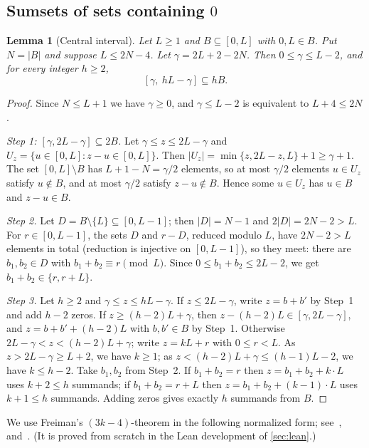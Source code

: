 \documentclass[11pt,reqno]{amsart}
\numberwithin{equation}{section}
\newtheorem{lemma}[theorem]{Lemma}
\theoremstyle{definition}
\theoremstyle{remark}
\newcommand{\card}[1]{\lvert #1\rvert}
\begin{document}
\subsection{Sumsets of sets containing \texorpdfstring{$0$}{0}}

\begin{lemma}[Central interval]\label{lem:central}
Let $L\ge1$ and $B\subseteq[0,L]$ with $0,L\in B$. Put $N=\card B$ and suppose $L\le2N-4$. Let $\gamma=2L+2-2N$. Then $0\le\gamma\le L-2$, and for every integer $h\ge2$,
\[
 [\gamma,\ hL-\gamma]\subseteq hB .
\]
\end{lemma}

\begin{proof}
Since $N\le L+1$ we have $\gamma\ge0$, and $\gamma\le L-2$ is equivalent to $L+4\le2N$.

\emph{Step 1: $[\gamma,2L-\gamma]\subseteq2B$.} Let $\gamma\le z\le2L-\gamma$ and $U_z=\{u\in[0,L]:z-u\in[0,L]\}$. Then $\card{U_z}=\min\{z,2L-z,L\}+1\ge\gamma+1$. The set $[0,L]\setminus B$ has $L+1-N=\gamma/2$ elements, so at most $\gamma/2$ elements $u\in U_z$ satisfy $u\notin B$, and at most $\gamma/2$ satisfy $z-u\notin B$. Hence some $u\in U_z$ has $u\in B$ and $z-u\in B$.

\emph{Step 2.} Let $D=B\setminus\{L\}\subseteq[0,L-1]$; then $\card D=N-1$ and $2\card D=2N-2>L$. For $r\in[0,L-1]$, the sets $D$ and $r-D$, reduced modulo $L$, have $2N-2>L$ elements in total (reduction is injective on $[0,L-1]$), so they meet: there are $b_1,b_2\in D$ with $b_1+b_2\equiv r\pmod L$. Since $0\le b_1+b_2\le2L-2$, we get $b_1+b_2\in\{r,r+L\}$.

\emph{Step 3.} Let $h\ge2$ and $\gamma\le z\le hL-\gamma$. If $z\le2L-\gamma$, write $z=b+b'$ by Step~1 and add $h-2$ zeros. If $z\ge(h-2)L+\gamma$, then $z-(h-2)L\in[\gamma,2L-\gamma]$, and $z=b+b'+(h-2)L$ with $b,b'\in B$ by Step~1. Otherwise $2L-\gamma<z<(h-2)L+\gamma$; write $z=kL+r$ with $0\le r<L$. As $z>2L-\gamma\ge L+2$, we have $k\ge1$; as $z<(h-2)L+\gamma\le(h-1)L-2$, we have $k\le h-2$. Take $b_1,b_2$ from Step~2. If $b_1+b_2=r$ then $z=b_1+b_2+k\cdot L$ uses $k+2\le h$ summands; if $b_1+b_2=r+L$ then $z=b_1+b_2+(k-1)\cdot L$ uses $k+1\le h$ summands. Adding zeros gives exactly $h$ summands from $B$.
\end{proof}

We use Freiman's $(3k-4)$-theorem in the following normalized form; see~\cite{Fr73}, \cite[Chapter~1]{Na96} and~\cite{LS95}. (It is proved from scratch in the Lean development of \cref{sec:lean}.)
\end{document}
